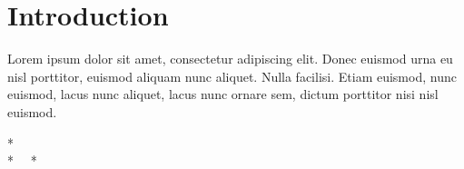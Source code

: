 \section*{Introduction}
  Lorem ipsum dolor sit amet, consectetur adipiscing elit.
  Donec euismod urna eu nisl porttitor, euismod aliquam nunc aliquet.
  Nulla facilisi.
  Etiam euismod, nunc euismod, lacus nunc aliquet, lacus nunc ornare sem, dictum porttitor nisi nisl euismod.

  \vspace{3em}
\begin{center}
  \begin{Large}
* \\
*  \ \ *
\end{Large}
\end{center}



